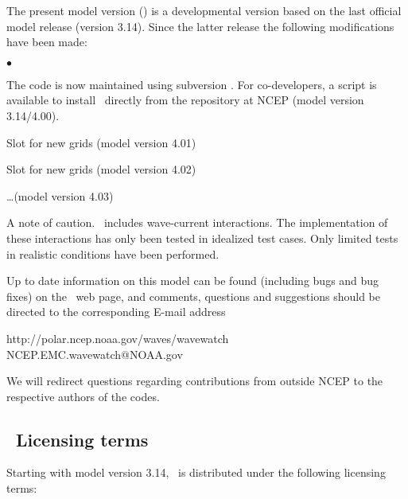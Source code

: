 \vspace{\baselineskip} 
\pb
\noindent 
The present model version (\WWver) is a developmental version based on the
last official model release (version 3.14). Since the latter release the
following modifications have been made:

\begin{list}{$\bullet$}{\rightmargin 5mm \parsep 0mm \itemsep 0mm}

\item
The code is now maintained using subversion \citep{bk:CSea06}. For
co-developers, a script is available to install \ws\ directly from the
repository at NCEP \citep[see][]{tol:MMAB09b} (model version 3.14/4.00).

\item
Slot for new grids (model version 4.01)

\item
Slot for new grids (model version 4.02)

\item
\ldots (model version 4.03)

\end{list}

\vspace{\baselineskip} \noindent 
A note of caution. \ww\ includes wave-current interactions. The implementation
of these interactions has only been tested in idealized test cases. Only
limited tests in realistic conditions have been performed.

\vspace{\baselineskip} \noindent 
Up to date information on this model can be found (including bugs and bug
fixes) on the \ww\ web page, and comments, questions and suggestions should be
directed to the corresponding E-mail address

\begin{center}
http://polar.ncep.noaa.gov/waves/wavewatch \\
NCEP.EMC.wavewatch@NOAA.gov
\end{center}

\noindent
We will redirect questions regarding contributions from outside NCEP to the
respective authors of the codes.


\vssub
\subsection{~Licensing terms}
\vssub

Starting with model version 3.14, \ww\ is distributed under the following
licensing terms:

